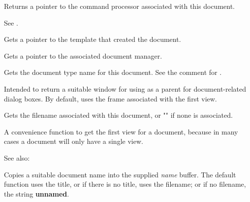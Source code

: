 
Returns a pointer to the command processor associated with this document.

See .



Gets a pointer to the template that created the document.



Gets a pointer to the associated document manager.



Gets the document type name for this document. See the comment for .



Intended to return a suitable window for using as a parent for document-related
dialog boxes. By default, uses the frame associated with the first view.



Gets the filename associated with this document, or "" if none is
associated.

\label{wxdocumentgetfirstview}


A convenience function to get the first view for a document, because
in many cases a document will only have a single view.

See also: 



Copies a suitable document name into the supplied {\it name} buffer. The default
function uses the title, or if there is no title, uses the filename; or if no
filename, the string {\bf unnamed}. 

